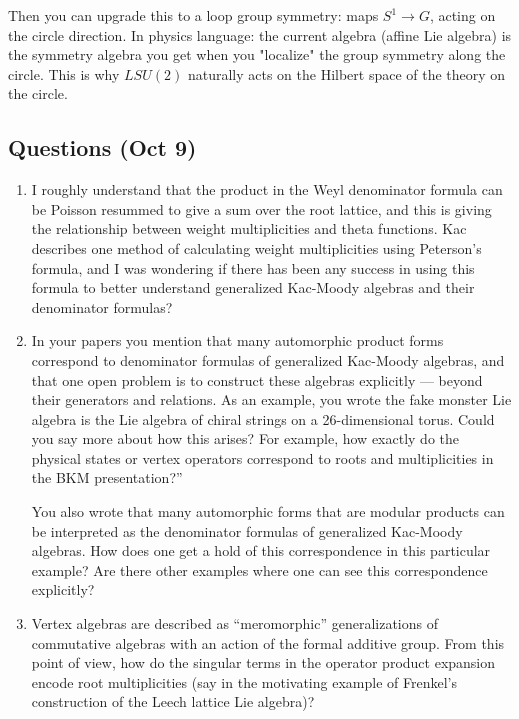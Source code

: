 \documentclass[12pt]{article}
\begin{document}
Then you can upgrade this to a loop group symmetry: maps $S^1 \to G$, acting on the circle direction. In physics language: the current algebra (affine Lie algebra) is the symmetry algebra you get when you "localize" the group symmetry along the circle. This is why $LSU(2)$ naturally acts on the Hilbert space of the theory on the circle.

\subsection*{Questions (Oct 9)}

\begin{enumerate}
    \item I roughly understand that the product in the Weyl denominator formula can be Poisson resummed to give a sum over the root lattice, and this is giving the relationship between weight multiplicities and theta functions. Kac describes one method of calculating weight multiplicities using Peterson's formula, and I was wondering if there has been any success in using this formula to better understand generalized Kac-Moody algebras and their denominator formulas?

    \item In your papers you mention that many automorphic product forms correspond to denominator formulas of generalized Kac-Moody algebras, and that one open problem is to construct these algebras explicitly — beyond their generators and relations.
 As an example, you wrote the fake monster Lie algebra is the Lie algebra of chiral strings on a 26-dimensional torus. Could you say more about how this arises? For example, how exactly do the physical states or vertex operators correspond to roots and multiplicities in the BKM presentation?”

    You also wrote that many automorphic forms that are modular products can be interpreted as the denominator formulas of generalized Kac-Moody algebras. How does one get a hold of this correspondence in this particular example? Are there other examples where one can see this correspondence explicitly?

    \item Vertex algebras are described as “meromorphic”
generalizations of commutative algebras with an action of the formal additive group. From this point of view, how do the singular terms in the operator product expansion encode root multiplicities (say in the motivating example of Frenkel's construction of the Leech lattice Lie algebra)?


\end{enumerate}
\end{document}
